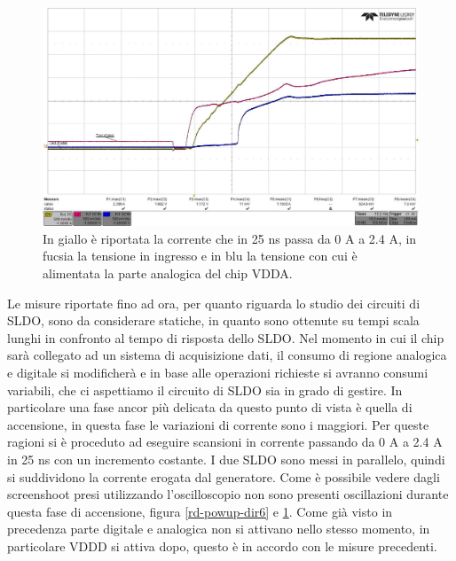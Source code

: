 \begin{figure}
\centering
\includegraphics[scale=.3]{Immagini/rd-powup-dir7}
\caption{In giallo è riportata la corrente che in 25 ns passa da 0 A a 2.4 A, in fucsia la tensione in ingresso e in blu la tensione con cui è alimentata la parte analogica del chip VDDA.}
\label{rd-powup-dir7}
\end{figure}
Le misure riportate fino ad ora, per quanto riguarda lo studio dei circuiti di SLDO, sono da considerare statiche, in quanto sono ottenute su tempi scala lunghi in confronto al tempo di risposta dello SLDO. 
Nel momento in cui il chip sarà collegato ad un sistema di acquisizione dati, il consumo di regione analogica e digitale si modificherà e in base alle operazioni richieste si avranno consumi variabili, che ci aspettiamo il circuito di SLDO sia in grado di gestire. 
In particolare una fase ancor più delicata da questo punto di vista è quella di accensione, in questa fase le variazioni di corrente sono i maggiori. 
Per queste ragioni si è proceduto ad eseguire scansioni in corrente passando da 0 A a 2.4 A in 25 ns con un incremento costante. I due SLDO sono messi in parallelo, quindi si suddividono la corrente erogata dal generatore. Come è possibile vedere dagli screenshoot presi utilizzando l'oscilloscopio non sono presenti oscillazioni durante questa fase di accensione, figura \ref{rd-powup-dir6} e \ref{rd-powup-dir7}. 
Come già visto in precedenza parte digitale e analogica non si attivano nello stesso momento, in particolare VDDD si attiva dopo, questo è in accordo con le misure precedenti.



